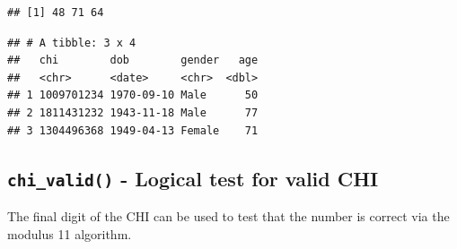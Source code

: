 \documentclass[
]{book}
\newenvironment{Shaded}{\begin{snugshade}}{\end{snugshade}}
\newcommand{\CommentTok}[1]{\textcolor[rgb]{0.56,0.35,0.01}{\textit{#1}}}
\newcommand{\DataTypeTok}[1]{\textcolor[rgb]{0.13,0.29,0.53}{#1}}
\newcommand{\KeywordTok}[1]{\textcolor[rgb]{0.13,0.29,0.53}{\textbf{#1}}}
\newcommand{\NormalTok}[1]{#1}
\newcommand{\OperatorTok}[1]{\textcolor[rgb]{0.81,0.36,0.00}{\textbf{#1}}}
\newcommand{\StringTok}[1]{\textcolor[rgb]{0.31,0.60,0.02}{#1}}
\begin{document}
\begin{verbatim}
## [1] 48 71 64
\end{verbatim}

\begin{Shaded}
\end{Shaded}

\begin{verbatim}
## # A tibble: 3 x 4
##   chi        dob        gender   age
##   <chr>      <date>     <chr>  <dbl>
## 1 1009701234 1970-09-10 Male      50
## 2 1811431232 1943-11-18 Male      77
## 3 1304496368 1949-04-13 Female    71
\end{verbatim}

\hypertarget{chi_valid---logical-test-for-valid-chi}{%
\subsection{\texorpdfstring{\texttt{chi\_valid()} - Logical test for valid CHI}{chi\_valid() - Logical test for valid CHI}}\label{chi_valid---logical-test-for-valid-chi}}

The final digit of the CHI can be used to test that the number is correct via the modulus 11 algorithm.
\end{document}
